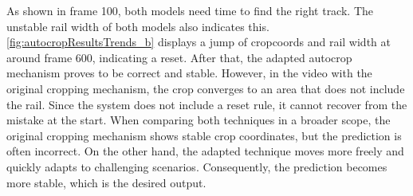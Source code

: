 As shown in frame 100, both models need time to find the right track.
The unstable rail width of both models also indicates this.
\autoref{fig:autocropResultsTrends_b} displays a jump of cropcoords and rail width at around frame 600, indicating a reset.
After that, the adapted autocrop mechanism proves to be correct and stable.
However, in the video with the original cropping mechanism, the crop converges to an area that does not include the rail.
Since the system does not include a reset rule, it cannot recover from the mistake at the start.
When comparing both techniques in a broader scope, the original cropping mechanism shows stable crop coordinates, but the prediction is often incorrect.
On the other hand, the adapted technique moves more freely and quickly adapts to challenging scenarios.
Consequently, the prediction becomes more stable, which is the desired output.